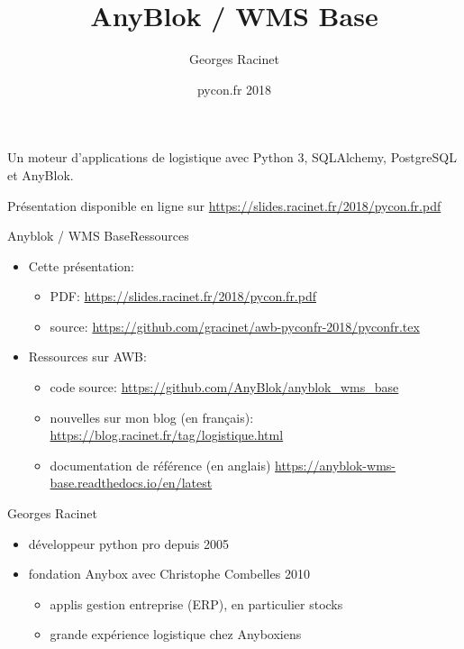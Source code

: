 \documentclass{beamer}
\title{AnyBlok / WMS Base}
\author{Georges Racinet}
\institute{Anybox, \url{https://anybox.fr}}
\date{pycon.fr 2018}
\begin{document}
  \begin{frame}
    \titlepage
    \begin{center}
      Un moteur d'applications de logistique avec Python 3, SQLAlchemy,
      PostgreSQL et AnyBlok.
    \end{center}

    Présentation disponible en ligne sur
    \url{https://slides.racinet.fr/2018/pycon.fr.pdf}
  \end{frame}

  \begin{frame}{Anyblok / WMS Base}{Ressources}

  \begin{itemize}
    \item Cette présentation:
      \begin{itemize}
        \item PDF: \url{https://slides.racinet.fr/2018/pycon.fr.pdf}
        \item source:
          \url{https://github.com/gracinet/awb-pyconfr-2018/pyconfr.tex}
      \end{itemize}
    \item Ressources sur AWB:
      \begin{itemize}
        \item code source: \url{https://github.com/AnyBlok/anyblok_wms_base}
        \item nouvelles sur mon blog (en français):
          \url{https://blog.racinet.fr/tag/logistique.html}
        \item documentation de référence (en anglais)
          \url{https://anyblok-wms-base.readthedocs.io/en/latest}
      \end{itemize}
  \end{itemize}
\end{frame}

\begin{frame}{Georges Racinet}
  \begin{itemize}
    \item développeur python pro depuis 2005
    \item fondation Anybox avec Christophe Combelles 2010
      \begin{itemize}
      \item applis gestion entreprise (ERP), en particulier stocks
      \item grande expérience logistique chez Anyboxiens
  \end{itemize}
\end{itemize}
\end{frame}
\end{document}
